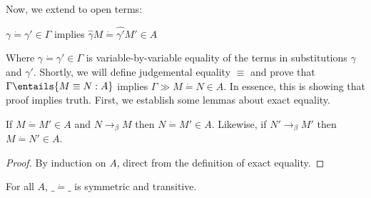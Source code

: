 \documentclass[letterpaper]{article}
\begin{document}
Now, we extend to open terms:


\begin{definition}[$\Gamma \gg M \dot{=} M' \in A$]
    $\gamma \dot{=} \gamma' \in \Gamma$ implies $\hat{\gamma} M \dot{=} \hat{\gamma'} M' \in A$ 
\end{definition}

Where $\gamma \dot{=} \gamma' \in \Gamma$ is variable-by-variable equality of the terms in substitutions $\gamma$ and $\gamma'$. 
Shortly, we will define judgemental equality $\equiv$ and prove that $\Gamma \entails{M \equiv N : A}$ implies $\Gamma \gg M \dot{=} N \in A$.
In essence, this is showing that proof implies truth. First, we establish some lemmas about exact equality.

\begin{lemma}\label{lem:headexpansion}
    If $M \dot{=} M' \in A$ and $N \to_\beta M$ then $N \dot{=} M' \in A$. Likewise, if $N' \to_\beta M'$ then $M \dot{=} N' \in A$. 
\end{lemma}
\begin{proof}
By induction on $A$, direct from the definition of exact equality.
\end{proof}

\begin{lemma}
    For all $A$, $\_ \dot{=} \_$ is symmetric and transitive. 
\end{lemma}
\end{document}
